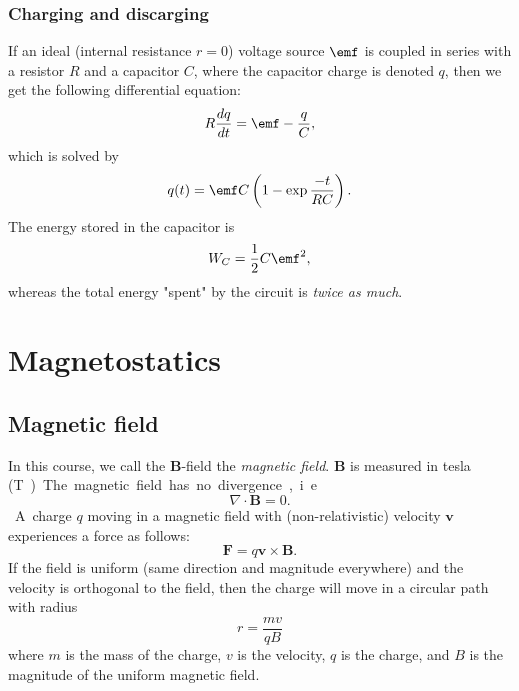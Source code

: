 \documentclass[a4paper, 12pt]{article}
\renewcommand{\vec}[1]{\mathbf{#1}}
\newcommand{\Epsilon}{\emf}
\newcommand{\B}{\ensuremath{\vec{B}}}
\begin{document}
    \subsubsection{Charging and discarging}
        If an ideal (internal resistance $r=0$) voltage source $\Epsilon$ is coupled in series with a resistor $R$ and a capacitor $C$, where the capacitor charge is denoted $q$, then we get the following differential equation: 
        \begin{equation}
            R\frac{dq}{dt} = \Epsilon - \frac{q}{C},
        \end{equation}
        which is solved by
        \begin{equation}
            q(t) = \Epsilon C \left(1-\exp{\frac{-t}{RC}}\right).
        \end{equation}
        The energy stored in the capacitor is 
        \begin{equation}
            W_C = \frac{1}{2}C\Epsilon^2,
        \end{equation}
        whereas the total energy "spent" by the circuit is \textit{twice as much}.

\section{Magnetostatics}
    \subsection{Magnetic field}
        In this course, we call the \B-field the \textit{magnetic field}. \B{} is measured in tesla (\si\tesla).
        
        The magnetic field has no divergence, i.e.
        \begin{equation}
            \nabla \cdot \B = 0.
        \end{equation}
        A charge $q$ moving in a magnetic field with (non-relativistic) velocity $\vec{v}$ experiences a force as follows: 
        \begin{equation}
            \vec{F} = q\vec{v}\times \B.
        \end{equation}
        If the field is uniform (same direction and magnitude everywhere) and the velocity is orthogonal to the field, then the charge will move in a circular path with radius
        \begin{equation}
            r = \frac{mv}{qB}
        \end{equation}
        where $m$ is the mass of the charge, $v$ is the velocity, $q$ is the charge, and $B$ is the magnitude of the uniform magnetic field.
        
\end{document}
